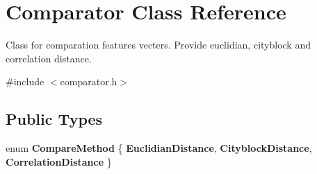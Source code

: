 \hypertarget{class_comparator}{\section{Comparator Class Reference}
\label{class_comparator}
}


Class for comparation features vecters. Provide euclidian, cityblock and correlation distance.  




{\ttfamily \#include $<$comparator.\+h$>$}

\subsection*{Public Types}
\begin{DoxyCompactItemize}
\item 
\hypertarget{class_comparator_a59be943b72aa42e567f0fd76c3d52531}{enum {\bfseries Compare\+Method} \{ {\bfseries Euclidian\+Distance}, 
{\bfseries Cityblock\+Distance}, 
{\bfseries Correlation\+Distance}
 \}}\label{class_comparator_a59be943b72aa42e567f0fd76c3d52531}

\end{DoxyCompactItemize}
